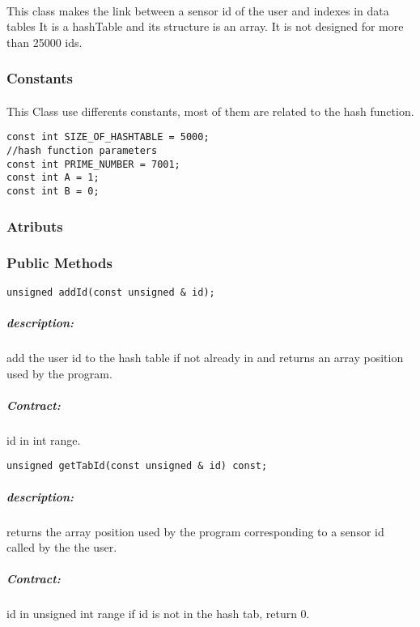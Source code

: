 \documentclass[a4paper, 12pts]{article}
\begin{document}
\paragraph{}
This class makes the link between a sensor id of the user and indexes in data tables
It is a hashTable and its structure is an array.
It is not designed for more than 25000 ids.

\subsubsection{Constants}

\paragraph{}
	This Class use differents constants, most of them are related to the hash function.

\begin{lstlisting}
const int SIZE_OF_HASHTABLE = 5000;
//hash function parameters
const int PRIME_NUMBER = 7001;
const int A = 1;
const int B = 0;
\end{lstlisting}

\subsubsection{Atributs}
\paragraph{}

\subsubsection{Public Methods}

\begin{lstlisting}
unsigned addId(const unsigned & id);
\end{lstlisting}
\subparagraph{description:}
	add the user id to the hash table if not already in and returns an array position used by the program.
\subparagraph{Contract:}
	id in int range.
\begin{lstlisting}
unsigned getTabId(const unsigned & id) const;
\end{lstlisting}
\subparagraph{description:}
	returns the array position used by the program corresponding to a sensor id called by the the user.
\subparagraph{Contract:}
	id in unsigned int range if id is not in the hash tab, return 0.
	
\end{document}
